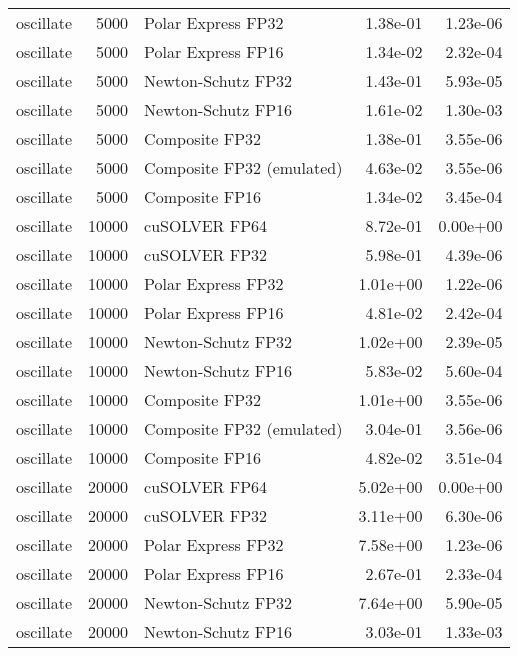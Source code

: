 \begin{table}
\begin{tabular}{lrlrr}
oscillate &  5000 &        Polar Express FP32 &  1.38e-01 &        1.23e-06 \\
oscillate &  5000 &        Polar Express FP16 &  1.34e-02 &        2.32e-04 \\
oscillate &  5000 &        Newton-Schutz FP32 &  1.43e-01 &        5.93e-05 \\
oscillate &  5000 &        Newton-Schutz FP16 &  1.61e-02 &        1.30e-03 \\
oscillate &  5000 &            Composite FP32 &  1.38e-01 &        3.55e-06 \\
oscillate &  5000 & Composite FP32 (emulated) &  4.63e-02 &        3.55e-06 \\
oscillate &  5000 &            Composite FP16 &  1.34e-02 &        3.45e-04 \\
oscillate & 10000 &             cuSOLVER FP64 &  8.72e-01 &        0.00e+00 \\
oscillate & 10000 &             cuSOLVER FP32 &  5.98e-01 &        4.39e-06 \\
oscillate & 10000 &        Polar Express FP32 &  1.01e+00 &        1.22e-06 \\
oscillate & 10000 &        Polar Express FP16 &  4.81e-02 &        2.42e-04 \\
oscillate & 10000 &        Newton-Schutz FP32 &  1.02e+00 &        2.39e-05 \\
oscillate & 10000 &        Newton-Schutz FP16 &  5.83e-02 &        5.60e-04 \\
oscillate & 10000 &            Composite FP32 &  1.01e+00 &        3.55e-06 \\
oscillate & 10000 & Composite FP32 (emulated) &  3.04e-01 &        3.56e-06 \\
oscillate & 10000 &            Composite FP16 &  4.82e-02 &        3.51e-04 \\
oscillate & 20000 &             cuSOLVER FP64 &  5.02e+00 &        0.00e+00 \\
oscillate & 20000 &             cuSOLVER FP32 &  3.11e+00 &        6.30e-06 \\
oscillate & 20000 &        Polar Express FP32 &  7.58e+00 &        1.23e-06 \\
oscillate & 20000 &        Polar Express FP16 &  2.67e-01 &        2.33e-04 \\
oscillate & 20000 &        Newton-Schutz FP32 &  7.64e+00 &        5.90e-05 \\
oscillate & 20000 &        Newton-Schutz FP16 &  3.03e-01 &        1.33e-03 \\

\end{tabular}
\end{table}
